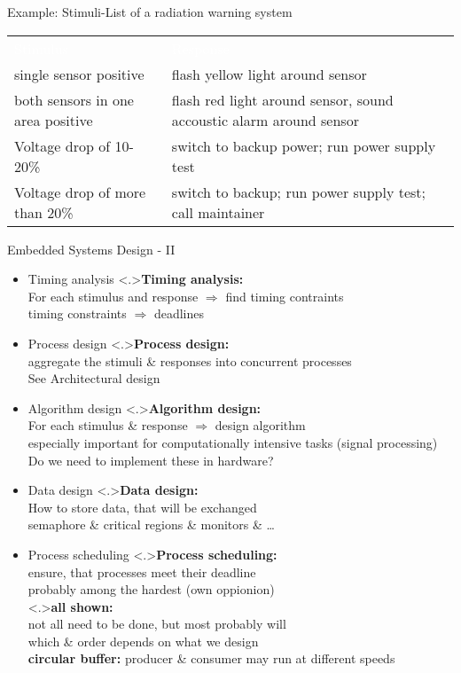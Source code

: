 \documentclass[ngerman={babel}, utf8, bigger, xcolor={table,dvipsnames}, ompress, hyperref={bookmarks,colorlinks}]{beamer}
\begin{document}
\begin{frame}{Example: Stimuli-List of a radiation warning system}
	\begin{tabular}{p{9em}p{13em}}
		\rowcolor{blue}\hline \textcolor{white}{Stimulus} & \textcolor{white}{Response} \\
		\pause single sensor positive & \pause flash yellow light around sensor \\
		\pause both sensors in one area positive & \pause flash red light around sensor, sound accoustic alarm around sensor\\
		\pause Voltage drop of 10-20\% & \pause switch to backup power; run power supply test \\
		\pause Voltage drop of more than 20\% & \pause switch to backup; run power supply test; call maintainer \\
	\end{tabular} \pause
\end{frame}

\begin{frame}{Embedded Systems Design - II}
	\begin{itemize}
		\item Timing analysis
		\note<.>{\textbf{Timing analysis:}\\ For each stimulus and response $\Rightarrow$ find timing contraints \\ timing constraints $\Rightarrow$ deadlines}
		\item Process design
		\note<.>{\textbf{Process design:}\\ aggregate the stimuli \& responses into concurrent processes \\
		See Architectural design}
		\item Algorithm design
		\note<.>{\textbf{Algorithm design:}\\ For each stimulus \& response $\Rightarrow$ design algorithm \\ especially important for computationally intensive tasks (signal processing) \\ Do we need to implement these in hardware?}
		\item Data design
		\note<.>{\textbf{Data design:}\\ How to store data, that will be exchanged \\ semaphore \& critical regions \& monitors \& \dots}
		\item Process scheduling
		\note<.>{\textbf{Process scheduling:}\\ ensure, that processes meet their deadline \\ probably among the hardest (own oppionion) \\}
		\note<.>{\textbf{all shown:}\\ not all need to be done, but most probably will \\ which \& order depends on what we design \\ \textbf{circular buffer:} producer \& consumer may run at different speeds}
	\end{itemize}
\end{frame}
\end{document}

